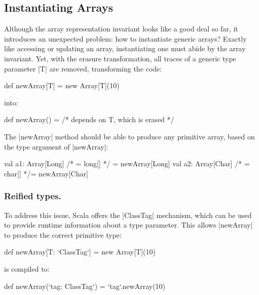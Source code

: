 \subsection{Instantiating Arrays}

Although the array representation invariant looks like a good deal so far, it introduces an unexpected problem: how to instantiate generic arrays? Exactly like accessing or updating an array, instantiating one must abide by the array invariant. Yet, with the erasure transformation, all traces of a generic type parameter |T| are removed, transforming the code:

\begin{lstlisting-nobreak}
 def newArray[T] = new Array[T](10)
\end{lstlisting-nobreak}

\noindent
into:

\begin{lstlisting-nobreak}
 def newArray() = /* depends on T, which is erased */
\end{lstlisting-nobreak}

The |newArray| method should be able to produce any primitive array, based on the type argument of |newArray|:

\begin{lstlisting-nobreak}
 val a1: Array[Long] /* = long[] */ = newArray[Long]
 val a2: Array[Char] /* = char[] */= newArray[Char]
\end{lstlisting-nobreak}

\subsubsection{Reified types.} To address this issue, Scala offers the |ClassTag| mechanism, which can be used to provide runtime information about a type parameter. This allows |newArray| to produce the correct primitive type:

\begin{lstlisting-nobreak}
 def newArray[T: `ClassTag`] = new Array[T](10)
\end{lstlisting-nobreak}

\noindent
is compiled to:

\begin{lstlisting-nobreak}
 def newArray(`tag: ClassTag`) = `tag`.newArray(10)
\end{lstlisting-nobreak}

